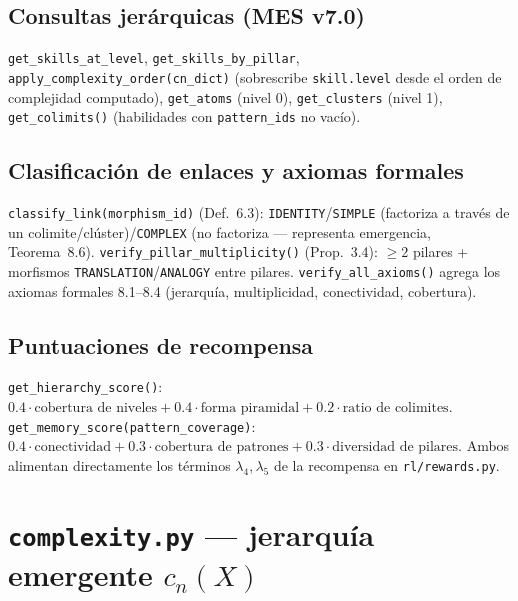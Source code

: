 \documentclass[11pt,a4paper]{report}
\newcommand{\code}[1]{\texttt{#1}}
\begin{document}
\subsection{Consultas jer\'arquicas (MES v7.0)}
\code{get_skills_at_level}, \code{get_skills_by_pillar}, \code{apply_complexity_order(cn_dict)} (sobrescribe \code{skill.level} desde el orden de complejidad computado), \code{get_atoms} (nivel 0), \code{get_clusters} (nivel 1), \code{get_colimits()} (habilidades con \code{pattern_ids} no vac\'io).

\subsection{Clasificaci\'on de enlaces y axiomas formales}
\code{classify_link(morphism_id)} (Def.~6.3): \code{IDENTITY}/\code{SIMPLE} (factoriza a trav\'es de un colimite/cl\'uster)/\code{COMPLEX} (no factoriza --- representa emergencia, Teorema~8.6). \code{verify_pillar_multiplicity()} (Prop.~3.4): $\ge2$ pilares + morfismos \code{TRANSLATION}/\code{ANALOGY} entre pilares. \code{verify_all_axioms()} agrega los axiomas formales 8.1--8.4 (jerarqu\'ia, multiplicidad, conectividad, cobertura).

\subsection{Puntuaciones de recompensa}
\code{get_hierarchy_score()}: $0.4\cdot\text{cobertura de niveles} + 0.4\cdot\text{forma piramidal} + 0.2\cdot\text{ratio de colimites}$. \code{get_memory_score(pattern\_coverage)}: $0.4\cdot\text{conectividad}+0.3\cdot\text{cobertura de patrones}+0.3\cdot\text{diversidad de pilares}$. Ambos alimentan directamente los t\'erminos $\lambda_4,\lambda_5$ de la recompensa en \code{rl/rewards.py}.

\section{\code{complexity.py} --- jerarqu\'ia emergente $c_n(X)$}
\end{document}
